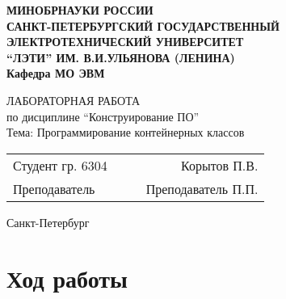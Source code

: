\documentclass[a4paper, 14pt]{extarticle}
\begin{document}
    
\begin{titlepage}
    \centering
    {\bfseries
        \uppercase{
            Минобрнауки России \\
            Санкт-Петербургский государственный \\
            Электротехнический университет \\
            \enquote{ЛЭТИ} им. В.И.Ульянова (Ленина)\\
        }
        Кафедра МО ЭВМ

        \vspace{\fill}
        \uppercase{Лабораторная работа} \\
        по дисциплине \enquote{Конструирование ПО} \\
        Тема: Программирование контейнерных классов
    }

    \vspace{\fill}
    \begin{tabularx}{0.8\textwidth}{l X c r}
        Студент гр. 6304 & & \underline{\hspace{3cm}} & Корытов П.В.\\
        Преподаватель & & \underline{\hspace{3cm}} & Преподаватель П.П. 
    \end{tabularx}

    \vspace{1cm}
    Санкт-Петербург \\
    \the\year{}
\end{titlepage}
\newpage
\tableofcontents{}
\newpage

\section{Ход работы}
\end{document}
